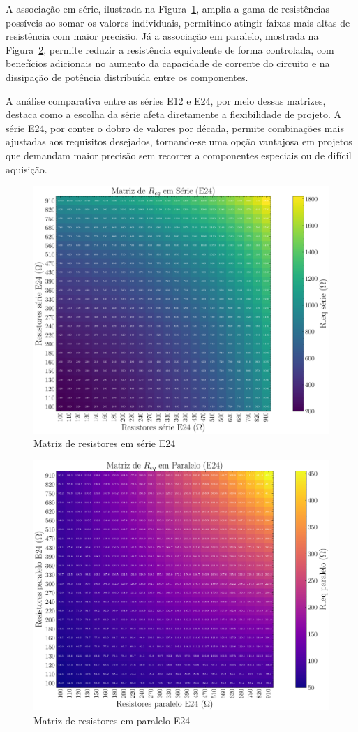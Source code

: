 \documentclass[conference]{IEEEtran}
\begin{document}
A associação em série, ilustrada na Figura~\ref{fig:matriz_serie_e24}, amplia a gama de resistências possíveis ao somar os valores individuais, permitindo atingir faixas mais altas de resistência com maior precisão. Já a associação em paralelo, mostrada na Figura~\ref{fig:matriz_paralelo_e24}, permite reduzir a resistência equivalente de forma controlada, com benefícios adicionais no aumento da capacidade de corrente do circuito e na dissipação de potência distribuída entre os componentes.

A análise comparativa entre as séries E12 e E24, por meio dessas matrizes, destaca como a escolha da série afeta diretamente a flexibilidade de projeto. A série E24, por conter o dobro de valores por década, permite combinações mais ajustadas aos requisitos desejados, tornando-se uma opção vantajosa em projetos que demandam maior precisão sem recorrer a componentes especiais ou de difícil aquisição.


\begin{figure}[htbp]
    \centering
    \caption{Matriz de resistores em série E24}
    \label{fig:matriz_serie_e24}
    \includegraphics[width=0.8\linewidth]{figures/matriz_serie_e24.pdf}
\end{figure}

\begin{figure}[htbp]
    \centering
    \caption{Matriz de resistores em paralelo E24}
    \label{fig:matriz_paralelo_e24}
    \includegraphics[width=0.8\linewidth]{figures/matriz_paralelo_e24.pdf}
\end{figure}
\end{document}

